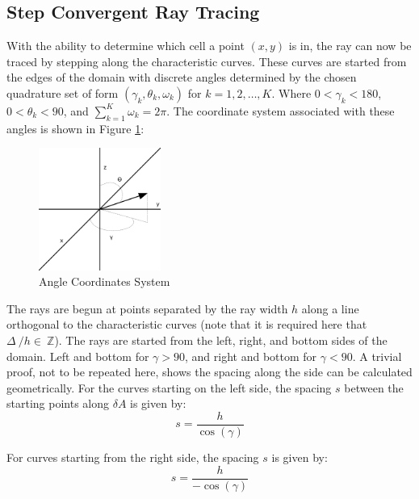 \documentclass{article}
\begin{document}
\subsection{Step Convergent Ray Tracing}

With the ability to determine which cell a point $(x,y)$ is in, the ray can now be traced by stepping along the characteristic curves. 
These curves are started from the edges of the domain with discrete angles determined by the chosen quadrature set of form $(\gamma_k,\theta_k,\omega_k)$ for $k=1,2,\dots,K$. Where $0<\gamma_k<180$, $0<\theta_k<90$, and $\sum_{k=1}^K\omega_k=2\pi$. 
The coordinate system associated with these angles is shown in Figure \ref{fig:anglecords}:

\begin{figure}[H]
\begin{center}
\includegraphics[width=40mm]{coordinates.png}
\end{center}
\caption{Angle Coordinates System}
\label{fig:anglecords}
\end{figure}

The rays are begun at points separated by the ray width $h$ along a line orthogonal to the characteristic curves (note that it is required here that $\Delta~ /h \in~ \mathbb{Z}$). 
The rays are started from the left, right, and bottom sides of the domain. 
Left and bottom for $\gamma>90$, and right and bottom for $\gamma<90$. 
A trivial proof, not to be repeated here, shows the spacing along the side can be calculated geometrically. For the curves starting on the left side, the spacing $s$ between the starting points along $\delta A$ is given by:
\begin{equation}
s=\frac{h}{\cos({\gamma})}
\label{eq:leftpsacing}
\end{equation}

For curves starting from the right side, the spacing $s$ is given by:
\begin{equation}
s=\frac{h}{-\cos({\gamma})}
\label{eq:rightspacing}
\end{equation}
\end{document}
